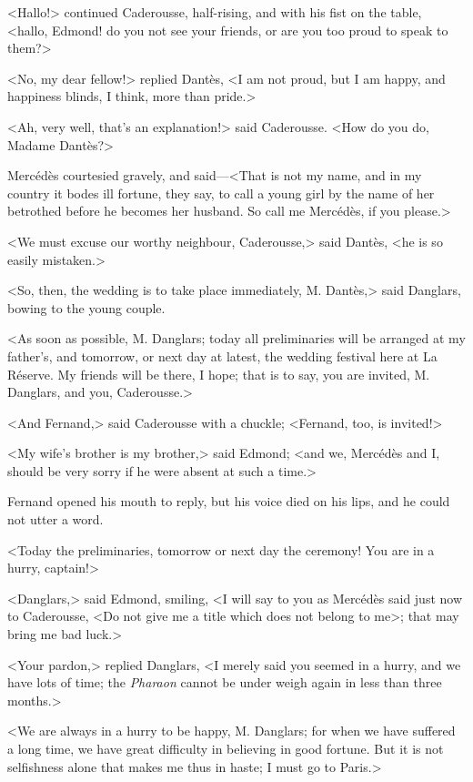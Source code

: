  <Hallo!> continued Caderousse, half-rising, and with his fist on the table, <hallo, Edmond! do you not see your friends, or are you too proud to speak to them?> 

 <No, my dear fellow!> replied Dantès, <I am not proud, but I am happy, and happiness blinds, I think, more than pride.> 

 <Ah, very well, that's an explanation!> said Caderousse. <How do you do, Madame Dantès?> 

 Mercédès courtesied gravely, and said—<That is not my name, and in my country it bodes ill fortune, they say, to call a young girl by the name of her betrothed before he becomes her husband. So call me Mercédès, if you please.> 

 <We must excuse our worthy neighbour, Caderousse,> said Dantès, <he is so easily mistaken.> 

 <So, then, the wedding is to take place immediately, M. Dantès,> said Danglars, bowing to the young couple. 

 <As soon as possible, M. Danglars; today all preliminaries will be arranged at my father's, and tomorrow, or next day at latest, the wedding festival here at La Réserve. My friends will be there, I hope; that is to say, you are invited, M. Danglars, and you, Caderousse.> 

 <And Fernand,> said Caderousse with a chuckle; <Fernand, too, is invited!> 

 <My wife's brother is my brother,> said Edmond; <and we, Mercédès and I, should be very sorry if he were absent at such a time.> 

 Fernand opened his mouth to reply, but his voice died on his lips, and he could not utter a word. 

 <Today the preliminaries, tomorrow or next day the ceremony! You are in a hurry, captain!> 

 <Danglars,> said Edmond, smiling, <I will say to you as Mercédès said just now to Caderousse, <Do not give me a title which does not belong to me>; that may bring me bad luck.> 

 <Your pardon,> replied Danglars, <I merely said you seemed in a hurry, and we have lots of time; the \textit{Pharaon} cannot be under weigh again in less than three months.> 

 <We are always in a hurry to be happy, M. Danglars; for when we have suffered a long time, we have great difficulty in believing in good fortune. But it is not selfishness alone that makes me thus in haste; I must go to Paris.> 

